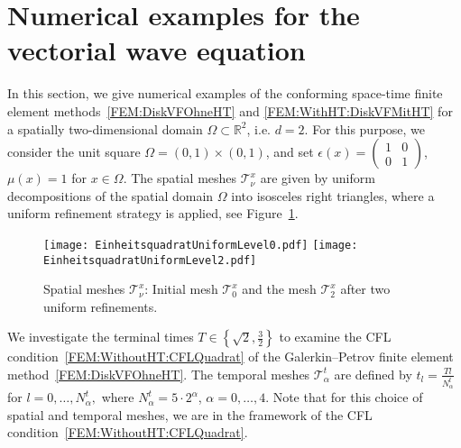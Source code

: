 \documentclass[a4paper,11pt]{article}
\newcommand{\R}{\mathbb R}
\begin{document}
\section{Numerical examples for the vectorial wave equation} \label{Sec:Num}

In this section, we give numerical examples of the conforming space-time finite element methods~\eqref{FEM:DiskVFOhneHT} and \eqref{FEM:WithHT:DiskVFMitHT} for a spatially two-dimensional domain $\Omega \subset \R^2$, i.e. $d=2$. For this purpose, we consider the unit square $\Omega = (0,1) \times (0,1)$, and set $\epsilon(x) = \begin{pmatrix}
	1 & 0 \\
	0 & 1   
\end{pmatrix}$, 
$\mu(x)=1$ for $x \in \Omega$. The spatial meshes $\mathcal T^x_\nu$ are given by uniform decompositions of the spatial domain $\Omega$ into isosceles right triangles, where a uniform refinement strategy is applied, see Figure~\ref{Num:Fig:NetzOrt}.
%
\begin{figure}[ht]
	\begin{center}
		\texttt{[image: EinheitsquadratUniformLevel0.pdf]}
		\texttt{[image: EinheitsquadratUniformLevel2.pdf]}
		\caption{Spatial meshes $\mathcal T^x_\nu$: Initial mesh $\mathcal T^x_0$ and the mesh $\mathcal T^x_2$ after two uniform refinements. }
		\label{Num:Fig:NetzOrt}
	\end{center}
\end{figure}
%
We investigate the terminal times $T \in \left\{ \sqrt{2}, \frac 3 2 \right\}$ to examine the CFL condition~\eqref{FEM:WithoutHT:CFLQuadrat} of the Galerkin--Petrov finite element method~\eqref{FEM:DiskVFOhneHT}. The temporal meshes $\mathcal T^t_\alpha$ are defined by $t_l = \frac{Tl}{N^t_\alpha}$ for $l=0,\dots,N^t_\alpha,$ where $N^t_\alpha = 5 \cdot 2^\alpha$, $\alpha=0,\dots,4$. Note that for this choice of spatial and temporal meshes, we are in the framework of the CFL condition~\eqref{FEM:WithoutHT:CFLQuadrat}.
\end{document}
